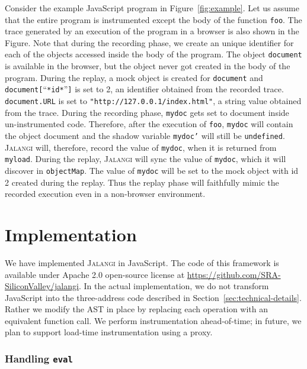 \documentclass{sig-alternate}
\def\jalangi{\textsc{Jalangi}}
\begin{document}
Consider the example JavaScript program in Figure~\ref{fig:example}.
Let us assume that the entire program is instrumented except the body
of the function \texttt{foo}.  The trace generated by an execution of
the program in a browser is also shown in the Figure.  Note that
during the recording phase, we create an unique identifier for each of
the objects accessed inside the body of the program.  The object
\texttt{document} is available in the browser, but the object never
got created in the body of the program.  During the replay, a mock
object is created for \texttt{document} and
\texttt{document[}``\texttt{*id*}''\texttt{]} is set to 2, an identifier obtained from
the recorded trace.  \texttt{document.URL} is set to
\texttt{"http://127.0.0.1/index.html"}, a string value obtained from
the trace.  During the recording phase, \texttt{mydoc} gets set to
document inside un-instrumented code.  Therefore, after the execution
of \texttt{foo}, \texttt{mydoc} will contain the object document and
the shadow variable \texttt{mydoc'} will still be \texttt{undefined}.
\jalangi{} will, therefore, record the value of \texttt{mydoc}, when
it is returned from \texttt{myload}.  During the replay, \jalangi{}
will sync the value of \texttt{mydoc}, which it will discover in
\texttt{objectMap}.  The value of \texttt{mydoc} will be set to the
mock object with id 2 created during the replay.  Thus the replay
phase will faithfully mimic the recorded execution even in a
non-browser environment.

\section{Implementation}
\label{sec:implementation}

We have implemented \jalangi{} in JavaScript.  The code of this
framework is available under Apache 2.0 open-source license at
\url{https://github.com/SRA-SiliconValley/jalangi}.  In the actual
implementation, we do not transform JavaScript into the three-address
code described in Section~\ref{sec:technical-details}.  Rather we
modify the AST in place by replacing each operation with an equivalent
function call.  We perform instrumentation ahead-of-time; in future, we
plan to support load-time instrumentation using a proxy.

\subsubsection*{Handling \texttt{eval}}
\label{sec:handling-texttteval}
\end{document}
